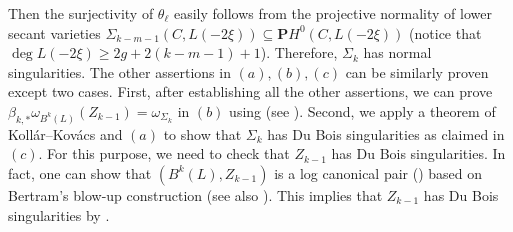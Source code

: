 \documentclass[graybox]{svmult}
\def\nP{\mathbf{P}}
\begin{document}
Then the surjectivity of $\theta_{\ell}$ easily follows from the projective normality of lower secant varieties $\Sigma_{k-m-1}(C, L(-2\xi)) \subseteq \nP H^0(C, L(-2\xi))$ (notice that $\deg L(-2\xi) \geq 2g + 2(k-m-1)+1$). Therefore, $\Sigma_k$ has normal singularities. The other assertions in $(a), (b), (c)$ can be similarly proven except two cases. First, after establishing all the other assertions, we can prove $\beta_{k,*}\omega_{B^k(L)}(Z_{k-1}) = \omega_{\Sigma_k}$ in $(b)$ using \cite[Theorem 1.1]{KSS} (see \cite[Proposition 3.6]{CKP}). Second, we apply a theorem of Koll\'{a}r--Kov\'{a}cs \cite[Corollary 6.28]{Kollar} and $(a)$ to show that $\Sigma_k$ has Du Bois singularities as claimed in $(c)$. For this purpose, we need to check that $Z_{k-1}$ has Du Bois singularities. In fact, one can show that $(B^k(L), Z_{k-1})$ is a log canonical pair (\cite[Proposition 3.15]{ENP1}) based on Bertram's blow-up construction \cite{Bertram} (see also \cite[Subsection 3.3]{ENP1}). This implies that $Z_{k-1}$ has Du Bois singularities by \cite[Corollary 6.32]{Kollar}.
\end{document}
